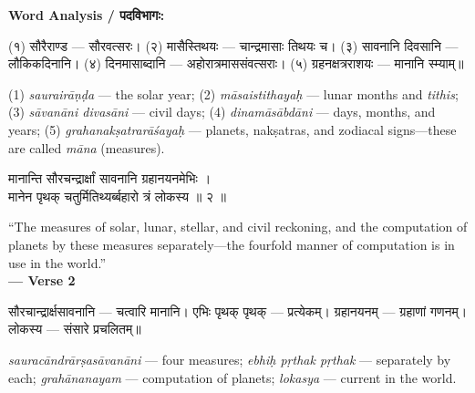 \documentclass[11pt,a4paper]{article}
\newcommand{\dev}[1]{{\devanagarifont #1}}
\newenvironment{bilingualverse}{%
  \begin{paracol}{2}
  \fontsize{10.5}{13}\selectfont
}{%
  \end{paracol}
  \vspace{0.3cm}
}
\newenvironment{paracol}[1]{\begingroup}{\endgroup}
\newenvironment{leftcolumn*}{\begingroup}{\endgroup}
\newenvironment{rightcolumn}{\begingroup}{\endgroup}
\begin{document}
\textbf{Word Analysis / \dev{पदविभागः}:}

\begin{paracol}{2}
\begin{leftcolumn*}
\dev{(१) सौरैराण्ड} — सौरवत्सरः। \dev{(२) मासैस्तिथयः} — चान्द्रमासाः तिथयः च। \dev{(३) सावनानि दिवसानि} — लौकिकदिनानि। \dev{(४) दिनमासाब्दानि} — अहोरात्रमाससंवत्सराः। \dev{(५) ग्रहनक्षत्रराशयः} — मानानि स्म्याम्॥
\end{leftcolumn*}
\begin{rightcolumn}
(1) \textit{saurairāṇḍa} — the solar year; (2) \textit{māsaistithayaḥ} — lunar months and \textit{tithis}; (3) \textit{sāvanāni divasāni} — civil days; (4) \textit{dinamāsābdāni} — days, months, and years; (5) \textit{grahanakṣatrarāśayaḥ} — planets, nakṣatras, and zodiacal signs---these are called \textit{māna} (measures).
\end{rightcolumn}
\end{paracol}

\vspace{0.4cm}

\begin{bilingualverse}
\begin{leftcolumn*}
\dev{मानान्ति सौरचन्द्रार्क्षां सावनानि ग्रहानयनमेभिः ।}\\
\dev{मानेन पृथक् चतुर्मितिथ्यर्ब्बहारो त्रं लोकस्य ॥ २ ॥}
\end{leftcolumn*}
\begin{rightcolumn}
``The measures of solar, lunar, stellar, and civil reckoning, and the computation of planets by these measures separately---the fourfold manner of computation is in use in the world.''\\[0.3cm]
\hfill\textbf{— Verse 2}
\end{rightcolumn}
\end{bilingualverse}

\begin{paracol}{2}
\begin{leftcolumn*}
\dev{सौरचान्द्रार्क्षसावनानि} — चत्वारि मानानि। \dev{एभिः पृथक् पृथक्} — प्रत्येकम्। \dev{ग्रहानयनम्} — ग्रहाणां गणनम्। \dev{लोकस्य} — संसारे प्रचलितम्॥
\end{leftcolumn*}
\begin{rightcolumn}
\textit{sauracāndrārṣasāvanāni} — four measures; \textit{ebhiḥ pṛthak pṛthak} — separately by each; \textit{grahānanayam} — computation of planets; \textit{lokasya} — current in the world.
\end{rightcolumn}
\end{paracol}
\end{document}
